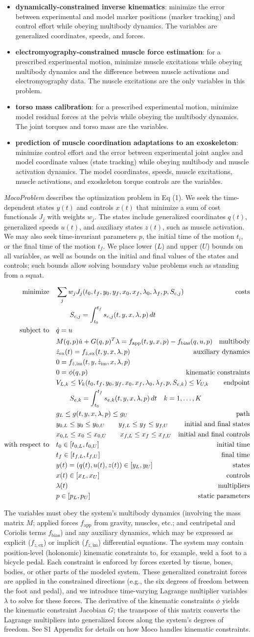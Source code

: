 \documentclass[10pt,letterpaper]{article}
\newcommand{\ocp}{
\begin{align}
    \begin{aligned}
        \mbox{minimize}
         \quad & \sum_j w_{j} J_{j}(t_0, t_f, y_0, y_f, x_{0}, \mathrlap{x_{f}, \lambda_0, \lambda_f, p, S_{c,j})} & \textrm{costs} \\
        & \quad\quad S_{c,j} = \int_{t_0}^{t_f} s_{c,j}(t, y, x, \lambda, p)\,dt  \\
        \mbox{subject to}
         \quad & \dot{q} = u \\
         & M(q, p)\dot{u} + G(q, p)^T \lambda = \mathrlap{f_{\mathrm{app}}(t, y, x, p) - f_{\mathrm{bias}}(q, u, p)}  & \textrm{multibody} \\
         & \dot{z}_\textrm{ex}(t) = f_{\dot{z},\textrm{ex}}(t, y, x, \lambda, p) & \textrm{auxiliary dynamics} \\
         & 0 = f_{\dot{z},\textrm{im}}(t, y, \dot{z}_{\textrm{im}}, x, \lambda, p) \\
         & 0 = \phi(q, p) & \textrm{kinematic constraints} \\
         & V_{L,k} \leq V_k(t_0, t_f, y_0, \mathrlap{y_f, x_{0}, x_{f}, \lambda_0, \lambda_f, p, S_{e,k}) \leq V_{U,k}} & \textrm{endpoint} \\
         & \quad\quad S_{e,k} = \mathrlap{\int_{t_0}^{t_f} s_{e,k}(t, y, x, \lambda, p)\,dt \quad k = 1, \ldots, K}\\
         & g_{L} \leq g(t, y, x, \lambda, p) \leq g_{U} & \textrm{path} \\
         & y_{0,L} \leq y_0 \leq y_{0,U} \quad\quad y_{f,L} \leq y_f \leq y_{f,U} & \textrm{initial and final states} \\
         & x_{0,L} \leq x_0 \leq x_{0,U} \quad\quad x_{f,L} \leq x_f \leq x_{f,U} & \textrm{initial and final controls} \\
         \mbox{with respect to} \quad
         & t_0 \in [t_{0,L}, t_{0,U}] & \textrm{initial time} \\
         & t_f \in [t_{f,L}, t_{f,U}] & \textrm{final time} \\
         & y(t) = (q(t), u(t), z(t)) \in [y_{L}, y_{U}] & \textrm{states} \\
         & x(t) \in [x_{L}, x_{U}] & \textrm{controls} \\
         & \lambda(t) & \textrm{multipliers} \\
         & p \in [p_{L}, p_{U}] & \textrm{static parameters}
    \end{aligned}
\end{align}
}
\begin{document}
\begin{itemize}
\item \textbf{dynamically-constrained inverse kinematics}: minimize the error between experimental and model marker positions (marker tracking) and control effort while obeying multibody dynamics. The variables are generalized coordinates, speeds, and forces.
\item \textbf{electromyography-constrained muscle force estimation}: for a prescribed experimental motion, minimize muscle excitations while obeying multibody dynamics and the difference between muscle activations and electromyography data. The muscle excitations are the only variables in this problem.
\item \textbf{torso mass calibration}: for a prescribed experimental motion, minimize model residual forces at the pelvis while obeying the multibody dynamics. The joint torques and torso mass are the variables.
\item \textbf{prediction of muscle coordination adaptations to an exoskeleton}: minimize control effort and the error between experimental joint angles and model coordinate values (state tracking) while obeying multibody and muscle activation dynamics. The model coordinates, speeds, muscle excitations, muscle activations, and exoskeleton torque controls are the variables.
\end{itemize}
\textit{MocoProblem} describes the optimization problem in Eq (1). We seek the time-dependent states $y(t)$ and controls $x(t)$ that minimize a sum of cost functionals $J_j$ with weights $w_j$. The states include generalized coordinates $q(t)$, generalized speeds $u(t)$, and auxiliary states $z(t)$, such as muscle activation. We may also seek time-invariant parameters $p$, the initial time of the motion $t_i$, or the final time of the motion $t_f$. We place lower ($L$) and upper ($U$) bounds on all variables, as well as bounds on the initial and final values of the states and controls; such bounds allow solving boundary value problems such as standing from a squat.

\ocp

The variables must obey the system’s multibody dynamics (involving the mass matrix $M$; applied forces $f_\mathrm{app}$ from gravity, muscles, etc.; and centripetal and Coriolis terms $f_\mathrm{bias}$) and any auxiliary dynamics, which may be expressed as explicit ($f_{\dot{z},\mathrm{ex}}$) or implicit ($f_{\dot{z},\mathrm{im}}$) differential equations. The system may contain position-level (holonomic) kinematic constraints to, for example, weld a foot to a bicycle pedal. Each constraint is enforced by forces exerted by tissue, bones, bodies, or other parts of the modeled system. These generalized constraint forces are applied in the constrained directions (e.g., the six degrees of freedom between the foot and pedal), and we introduce time-varying Lagrange multiplier variables $\lambda$ to solve for these forces. The derivative of the kinematic constraints $\phi$ yields the kinematic constraint Jacobian $G$; the transpose of this matrix converts the Lagrange multipliers into generalized forces along the system’s degrees of freedom. See S1 Appendix for details on how Moco handles kinematic constraints.
\end{document}
